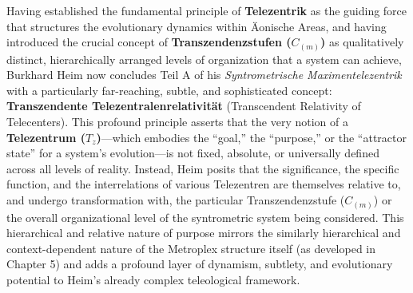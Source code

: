 \documentclass[12pt]{article}
\newcommand{\q}[1]{\enquote{#1}}
\newcommand{\telezentrum}{T_z}
\begin{document}
Having established the fundamental principle of \textbf{Telezentrik} as the guiding force that structures the evolutionary dynamics within Äonische Areas, and having introduced the crucial concept of \textbf{Transzendenzstufen (\( C_{(m)} \))} as qualitatively distinct, hierarchically arranged levels of organization that a system can achieve, Burkhard Heim now concludes Teil A of his \textit{Syntrometrische Maximentelezentrik} with a particularly far-reaching, subtle, and sophisticated concept: \textbf{Transzendente Telezentralenrelativität} (Transcendent Relativity of Telecenters). This profound principle asserts that the very notion of a \textbf{Telezentrum (\( \telezentrum \))}—which embodies the \q{goal,} the \q{purpose,} or the \q{attractor state} for a system's evolution—is not fixed, absolute, or universally defined across all levels of reality. Instead, Heim posits that the significance, the specific function, and the interrelations of various Telezentren are themselves relative to, and undergo transformation with, the particular Transzendenzstufe (\(C_{(m)}\)) or the overall organizational level of the syntrometric system being considered. This hierarchical and relative nature of purpose mirrors the similarly hierarchical and context-dependent nature of the Metroplex structure itself (as developed in Chapter 5) and adds a profound layer of dynamism, subtlety, and evolutionary potential to Heim's already complex teleological framework.
\end{document}
